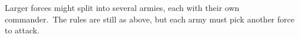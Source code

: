 Larger forces might split into several armies, each with their own commander. The rules are still as above, but each army must pick another force to attack.




